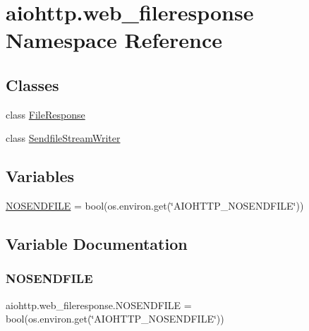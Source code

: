 \hypertarget{namespaceaiohttp_1_1web__fileresponse}{}\section{aiohttp.\+web\+\_\+fileresponse Namespace Reference}
\label{namespaceaiohttp_1_1web__fileresponse}
\subsection*{Classes}
\begin{DoxyCompactItemize}
\item 
class \hyperlink{classaiohttp_1_1web__fileresponse_1_1_file_response}{File\+Response}
\item 
class \hyperlink{classaiohttp_1_1web__fileresponse_1_1_sendfile_stream_writer}{Sendfile\+Stream\+Writer}
\end{DoxyCompactItemize}
\subsection*{Variables}
\begin{DoxyCompactItemize}
\item 
\hyperlink{namespaceaiohttp_1_1web__fileresponse_a271fbeb6d36e8e864a4be341e0bbc9bd}{N\+O\+S\+E\+N\+D\+F\+I\+LE} = bool(os.\+environ.\+get(\char`\"{}A\+I\+O\+H\+T\+T\+P\+\_\+\+N\+O\+S\+E\+N\+D\+F\+I\+LE\char`\"{}))
\end{DoxyCompactItemize}


\subsection{Variable Documentation}
\mbox{\label{namespaceaiohttp_1_1web__fileresponse_a271fbeb6d36e8e864a4be341e0bbc9bd}} 
\subsubsection{\texorpdfstring{N\+O\+S\+E\+N\+D\+F\+I\+LE}{NOSENDFILE}}
{\footnotesize\ttfamily aiohttp.\+web\+\_\+fileresponse.\+N\+O\+S\+E\+N\+D\+F\+I\+LE = bool(os.\+environ.\+get(\char`\"{}A\+I\+O\+H\+T\+T\+P\+\_\+\+N\+O\+S\+E\+N\+D\+F\+I\+LE\char`\"{}))}

